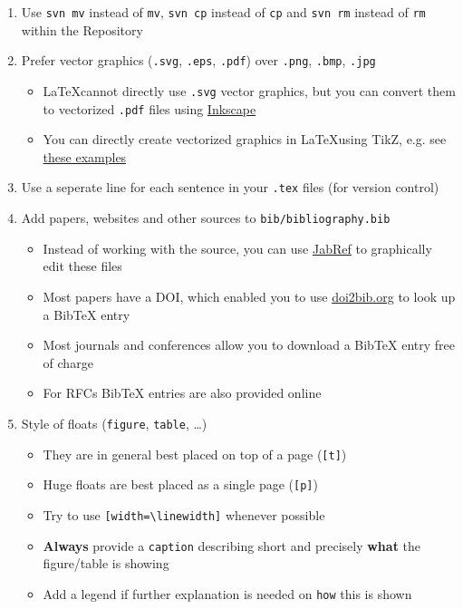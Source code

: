 \begin{enumerate}
	\item Use \texttt{svn mv} instead of \texttt{mv}, \texttt{svn cp} instead of \texttt{cp} and \texttt{svn rm} instead of \texttt{rm} within the Repository
	\item Prefer vector graphics (\texttt{.svg}, \texttt{.eps}, \texttt{.pdf}) over \texttt{.png}, \texttt{.bmp}, \texttt{.jpg}
	\begin{itemize}
		\item \LaTeX cannot directly use \texttt{.svg} vector graphics, but you can convert them to vectorized \texttt{.pdf} files using \href{http://www.inkscape.org/}{Inkscape}
		\item You can directly create vectorized graphics in \LaTeX using TikZ, e.g. see \href{http://www.texample.net/tikz/}{these examples}
	\end{itemize}
    \item Use a seperate line for each sentence in your \texttt{.tex} files (for version control)
	\item Add papers, websites and other sources to \texttt{bib/bibliography.bib}
	\begin{itemize}
		\item Instead of working with the source, you can use \href{http://jabref.sourceforge.net/}{JabRef} to graphically edit these files
		\item Most papers have a \gls{DOI}, which enabled you to use \href{https://doi2bib.org/}{doi2bib.org} to look up a BibTeX entry
		\item Most journals and conferences allow you to download a BibTeX entry free of charge
		\item For RFCs BibTeX entries are also provided online
	\end{itemize}
	\item Style of floats (\texttt{figure}, \texttt{table}, \ldots)
	\begin{itemize}
		\item They are in general best placed on top of a page (\texttt{[t]})
		\item Huge floats are best placed as a single page (\texttt{[p]})
		\item Try to use \texttt{[width=\textbackslash{}linewidth]} whenever possible
		\item \textbf{Always} provide a \texttt{caption} describing short and precisely \textbf{what} the figure/table is showing
		\item Add a legend if further explanation is needed on \texttt{how} this is shown
	\end{itemize}

\end{enumerate}
